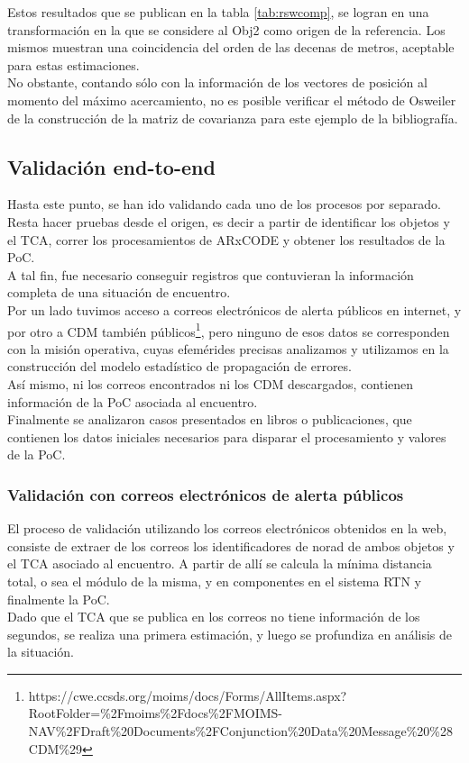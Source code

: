 Estos resultados que se publican en la tabla \ref{tab:rswcomp}, se logran en una transformaci\'on en la que se considere al Obj2 como origen de la referencia. Los mismos muestran una coincidencia del orden de las decenas de metros, aceptable para estas estimaciones.\\
No obstante, contando s\'olo con la informaci\'on de los vectores de posici\'on al momento del m\'aximo acercamiento, no es posible verificar el m\'etodo de Osweiler de la construcci\'on de la matriz de covarianza para este ejemplo de la bibliograf\'ia.\\

\subsection*{Validaci\'on end-to-end}
Hasta este punto, se han ido validando cada uno de los procesos por separado.\\
Resta hacer pruebas desde el origen, es decir a partir de identificar los objetos y el TCA, correr los procesamientos de ARxCODE y obtener los resultados de la PoC.\\
A tal fin, fue necesario conseguir registros que contuvieran la informaci\'on completa de una situaci\'on de encuentro.\\
Por un lado tuvimos acceso a correos electr\'onicos de alerta p\'ublicos en internet, y por otro a CDM tambi\'en p\'ublicos\footnote{https://cwe.ccsds.org/moims/docs/Forms/AllItems.aspx?RootFolder=\%2Fmoims\%2Fdocs\%2FMOIMS-NAV\%2FDraft\%20Documents\%2FConjunction\%20Data\%20Message\%20\%28CDM\%29}, pero ninguno de esos datos se corresponden con la misi\'on operativa, cuyas efem\'erides precisas analizamos y utilizamos en la construcci\'on del modelo estad\'istico de propagaci\'on de errores.\\
As\'i mismo, ni los correos encontrados ni los CDM descargados, contienen informaci\'on de la PoC asociada al encuentro. \\
Finalmente se analizaron casos presentados en libros o publicaciones, que contienen los datos iniciales necesarios para disparar el procesamiento y valores de la PoC.\\


\subsubsection*{Validaci\'on con correos electr\'onicos de alerta p\'ublicos}

El proceso de validaci\'on utilizando los correos electr\'onicos obtenidos en la web, consiste de extraer de los correos los identificadores de norad de ambos objetos y el TCA asociado al encuentro. A partir de all\'i se calcula la m\'inima distancia total, o sea el m\'odulo de la misma, y  en componentes en el sistema RTN y finalmente la PoC.\\
Dado que el TCA que se publica en los correos no tiene informaci\'on de los segundos, se realiza una primera estimaci\'on, y luego se profundiza en an\'alisis de la situaci\'on.\\

